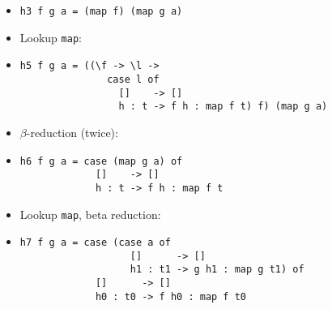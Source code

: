 \documentclass{beamer}
\begin{document}
\begin{frame}[fragile]

    \begin{itemize}[<+->]

        \item[]
            \begin{verbatim}
h3 f g a = (map f) (map g a)
            \end{verbatim}

        \item[] Lookup \texttt{map}:

        \item[]
            \begin{verbatim}
h5 f g a = ((\f -> \l ->
               case l of
                 []    -> []
                 h : t -> f h : map f t) f) (map g a)
              \end{verbatim}

          \item[] $\beta$-reduction (twice):

          \item[]
              \begin{verbatim}
h6 f g a = case (map g a) of
             []    -> []
             h : t -> f h : map f t
              \end{verbatim}

          \item[] Lookup \texttt{map}, beta reduction:

          \item[]
              \begin{verbatim}
h7 f g a = case (case a of
                   []      -> []
                   h1 : t1 -> g h1 : map g t1) of
             []      -> []
             h0 : t0 -> f h0 : map f t0
              \end{verbatim}

    \end{itemize}

\end{frame}
\end{document}
